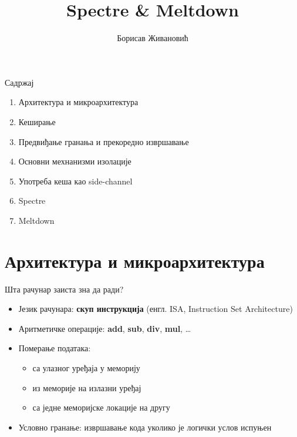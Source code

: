 \documentclass[xcolor=table]{beamer}
\title{Spectre \& Meltdown}
\author{Борисав Живановић}
\begin{document}
    \begin{frame}
        \maketitle
    \end{frame}

    \begin{frame}{Садржај}
        \begin{enumerate}
            \item Архитектура и микроархитектура
            \item Кеширање
            \item Предвиђање гранања и прекоредно извршавање
            \item Основни мехнанизми изолације
            \item Употреба кеша као side-channel
            \item Spectre
            \item Meltdown
        \end{enumerate}
    \end{frame}
    
    \section{Архитектура и микроархитектура}
    
    \begin{frame}{Шта рачунар заиста зна да ради?}
        \begin{itemize}
            \item Језик рачунара: \textbf{скуп инструкција} (енгл. ISA, Instruction Set Architecture)
            \item Аритметичке операције: \textbf{add}, \textbf{sub}, \textbf{div}, \textbf{mul}, …
            \item Померање података:
            \begin{itemize}
                \item са улазног уређаја у меморију
                \item из меморије на излазни уређај
                \item са једне меморијске локације на другу
            \end{itemize}
            \item Условно гранање: извршавање кода уколико је логички услов испуњен
        \end{itemize}
    \end{frame}
    
\end{document}
